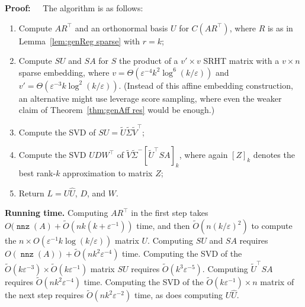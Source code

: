 \documentclass{sig-alternate}
\DeclareMathOperator{\nnz}{\mathtt{nnz}}
\newcommand\tO{\tilde{O}}
\newcommand{\eps}{\varepsilon}
\def\FullBox{\hbox{\vrule width 8pt height 8pt depth 0pt}}
\def\qed{\ifmmode\qquad\FullBox\else{\unskip\nobreak\hfil
\penalty50\hskip1em\null\nobreak\hfil\FullBox
\parfillskip=0pt\finalhyphendemerits=0\endgraf}\fi}
\newenvironment{proof}{\begin{trivlist} \item {\bf Proof:~~}}
  {\qed\end{trivlist}}
\begin{document}
\begin{proof}
The algorithm is as follows:
\begin{enumerate}
\item Compute $AR^\top$ and an orthonormal basis $U$ for $C(AR^\top)$,
	where $R$ is as in Lemma~\ref{lem:genReg sparse} with $r=k$;
\item Compute $SU$ and $SA$ for $S$ the product of a $v'\times v$
SRHT matrix with a $v\times n$ sparse embedding,
where $v = \Theta(\eps^{-4}k^2\log^6(k/\eps))$
and $v' = \Theta(\eps^{-3}k\log^2(k/\eps))$.
(Instead of this affine embedding construction,
an alternative might use leverage score sampling,
where even the weaker claim of Theorem~\ref{thm:genAff res}
would be enough.)
\item Compute the SVD of $SU = \tilde U\tilde \Sigma \tilde V^\top$;
\item Compute the SVD $\hat U D W^\top$ of $\tilde V\tilde \Sigma^- [\tilde U^\top SA]_k$,
	where again $[Z]_k$ denotes the best rank-$k$ approximation to matrix $Z$;
\item Return $L=U\hat U$, $D$, and $W$.
\end{enumerate}

{\bf Running time.}
Computing $AR^\top$ in the first step takes
$O(\nnz(A) + \tO(nk(k+\eps^{-1}))$ time,
and then $\tilde O(n(k/\eps)^2)$ to compute the $n\times O(\eps^{-1}k\log(k/\eps))$
matrix $U$. 
Computing $SU$ and $SA$ requires
$O(\nnz(A)) + \tO(n k^2\eps^{-4})$ time.
Computing the SVD of
the $\tilde O(k\eps^{-3}) \times \tilde O(k\eps^{-1})$  matrix $SU$
requires $\tilde O(k^3\eps^{-5})$. Computing $\tilde U^\top SA$
requires $\tilde O(nk^2\eps^{-4})$ time.
Computing the SVD of the
$\tilde O(k\eps^{-1})\times n$ matrix of the next step requires
$\tilde O(nk^2\eps^{-2})$ time, as does computing $U\hat U$.


\end{proof}
\end{document}
